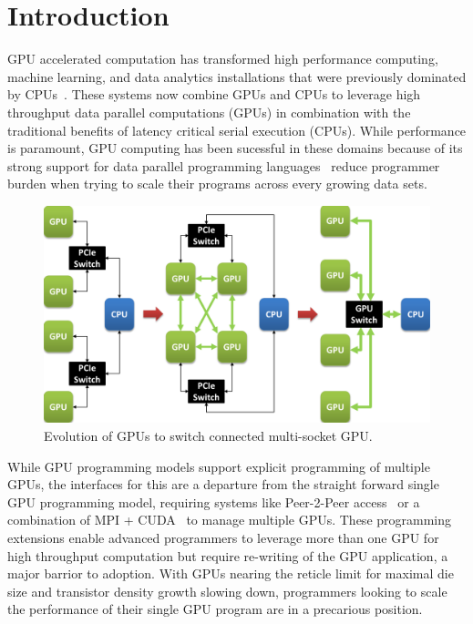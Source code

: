\section{Introduction}
\label{introduction}
GPU accelerated computation has transformed high performance computing,
machine learning, and data analytics installations that were previously
dominated by CPUs~\cite{pascal,intersect360,cudnn,Lavin15b,SimonyanZ14a}.
These systems now combine GPUs and CPUs to leverage high throughput data parallel
computations (GPUs) in combination with the traditional benefits of latency critical
serial execution (CPUs).  While performance is paramount, GPU computing has been 
sucessful in these domains because of its strong support for 
data parallel programming languages~\cite{CUDA7,OPENCL} reduce programmer burden
when trying to scale their programs across every growing data sets.

\begin{figure}[t]
\centering
\includegraphics[width=1.0\columnwidth]{figures/inter_gpu_connections.pdf}
\caption{Evolution of GPUs to switch connected multi-socket GPU.}
\label{fig:systemdiagram}
\vspace{-.15in}
\end{figure}

While GPU programming models support explicit programming of multiple GPUs, the 
interfaces for this are a departure from the straight forward single GPU 
programming model, requiring systems like Peer-2-Peer access~\cite{NVIDIAP2P} 
or a combination of MPI + CUDA~\cite{NVIDIAMPI} to manage multiple GPUs.  These 
programming extensions enable advanced programmers to leverage more than one 
GPU for high throughput computation but require re-writing of the GPU 
application, a major barrior to adoption.  With GPUs nearing the reticle limit 
for maximal die size and transistor density growth slowing down, programmers 
looking to scale the performance of their single GPU program are in a precarious 
position.

